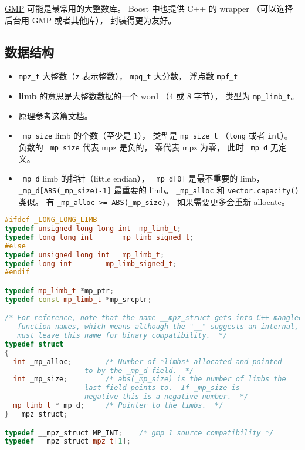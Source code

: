 
\href{https://gmplib.org/}{GMP} 可能是最常用的大整数库。 Boost 中也提供 C++ 的 wrapper （可以选择后台用 GMP 或者其他库）， 封装得更为友好。

\subsection{数据结构}
\begin{itemize}
\item \verb|mpz_t| 大整数（\verb|z| 表示整数）， \verb|mpq_t| 大分数， 浮点数 \verb|mpf_t|
\item \textbf{limb} 的意思是大整数数据的一个 word （4 或 8 字节）， 类型为 \verb|mp_limb_t|。
\item 原理参考\href{https://gmplib.org/manual/Integer-Internals#Integer-Internals}{这篇文档}。
\item \verb|_mp_size| limb 的个数（至少是 1）， 类型是 \verb|mp_size_t| （\verb|long| 或者 \verb|int|）。 负数的 \verb|_mp_size| 代表 mpz 是负的， 零代表 mpz 为零， 此时 \verb|_mp_d| 无定义。
\item \verb|_mp_d| limb 的指针（little endian）， \verb|_mp_d[0]| 是最不重要的 limb， \verb|_mp_d[ABS(_mp_size)-1]| 最重要的 limb。
\verb|_mp_alloc| 和 \verb|vector.capacity()| 类似。 有 \verb|_mp_alloc >= ABS(_mp_size)|， 如果需要更多会重新 allocate。
\end{itemize}

\begin{lstlisting}[language=cpp]
#ifdef _LONG_LONG_LIMB
typedef unsigned long long int	mp_limb_t;
typedef long long int		mp_limb_signed_t;
#else
typedef unsigned long int	mp_limb_t;
typedef long int		mp_limb_signed_t;
#endif

typedef mp_limb_t *mp_ptr;
typedef const mp_limb_t *mp_srcptr;

/* For reference, note that the name __mpz_struct gets into C++ mangled
   function names, which means although the "__" suggests an internal, we
   must leave this name for binary compatibility.  */
typedef struct
{
  int _mp_alloc;		/* Number of *limbs* allocated and pointed
				   to by the _mp_d field.  */
  int _mp_size;			/* abs(_mp_size) is the number of limbs the
				   last field points to.  If _mp_size is
				   negative this is a negative number.  */
  mp_limb_t *_mp_d;		/* Pointer to the limbs.  */
} __mpz_struct;

typedef __mpz_struct MP_INT;    /* gmp 1 source compatibility */
typedef __mpz_struct mpz_t[1];
\end{lstlisting}
